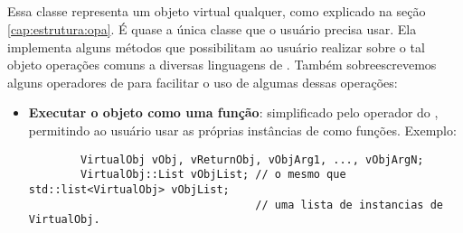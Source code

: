   \subsection{\VObj{}}
  \label{sec:atividades:opa:vobj}
  Essa classe representa um objeto virtual qualquer, como explicado na seção
  \ref{cap:estrutura:opa}. É quase a única classe que o
  usuário precisa usar. Ela implementa alguns métodos que possibilitam ao
  usuário realizar sobre o tal objeto operações comuns a diversas linguagens de
  \script{}. Também sobreescrevemos alguns operadores de \CXX{} para facilitar o
  uso de algumas dessas operações:
  \begin{itemize}
    \item \textbf{Executar o objeto como uma função}: simplificado pelo operador \lang{()}
      do \CXX{}, permitindo ao usuário usar as próprias instâncias de \VObj{} como
      funções. Exemplo:
      \vspace{1em}
      \begin{lstlisting}
        VirtualObj vObj, vReturnObj, vObjArg1, ..., vObjArgN; 
        VirtualObj::List vObjList; // o mesmo que std::list<VirtualObj> vObjList;
                                   // uma lista de instancias de VirtualObj.
                                   

\end{lstlisting}
\end{itemize}
